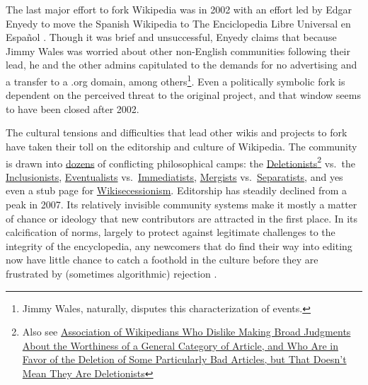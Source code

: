 \documentclass[notoc]{tufte-book}
\begin{document}
The last major effort to fork Wikipedia was in 2002 with an effort led
by Edgar Enyedy to move the Spanish Wikipedia to The Enciclopedia Libre
Universal en Español \citep{tkaczSpanishForkWikipedia2011, tkaczWikipediaPoliticsOpenness2014} . Though it was brief and
unsuccessful, Enyedy claims that because Jimmy Wales was worried about
other non-English communities following their lead, he and the other
admins capitulated to the demands for no advertising and a transfer to a
.org domain, among others\footnote{Jimmy Wales, naturally, disputes this
  characterization of events.}. Even a politically symbolic fork is
dependent on the perceived threat to the original project, and that
window seems to have been closed after 2002.

The cultural tensions and difficulties that lead other wikis and
projects to fork have taken their toll on the editorship and culture of
Wikipedia. The community is drawn into
\href{https://meta.wikimedia.org/wiki/Conflicting_Wikipedia_philosophies}{dozens}
of conflicting philosophical camps: the
\href{https://meta.wikimedia.org/wiki/Special:MyLanguage/Deletionism}{Deletionists}\footnote{Also
  see
  \href{https://meta.wikimedia.org/wiki/Association_of_Wikipedians_Who_Dislike_Making_Broad_Judgments_About_the_Worthiness_of_a_General_Category_of_Article,_and_Who_Are_in_Favor_of_the_Deletion_of_Some_Particularly_Bad_Articles,_but_That_Doesn\%27t_Mean_They_Are_Deletionists}{Association
  of Wikipedians Who Dislike Making Broad Judgments About the Worthiness
  of a General Category of Article, and Who Are in Favor of the Deletion
  of Some Particularly Bad Articles, but That Doesn't Mean They Are
  Deletionists}} vs.~the
\href{https://meta.wikimedia.org/wiki/Special:MyLanguage/Inclusionism}{Inclusionists},
\href{https://meta.wikimedia.org/wiki/Eventualism}{Eventualists}
vs.~\href{https://meta.wikimedia.org/wiki/Immediatism}{Immediatists},
\href{https://meta.wikimedia.org/wiki/Special:MyLanguage/Mergism}{Mergists}
vs.~\href{https://meta.wikimedia.org/wiki/Special:MyLanguage/Separatism}{Separatists},
and yes even a stub page for
\href{https://meta.wikimedia.org/wiki/Wikisecessionism}{Wikisecessionism}.
Editorship has steadily declined from a peak in 2007. Its relatively
invisible community systems make it mostly a matter of chance or
ideology that new contributors are attracted in the first place. In its
calcification of norms, largely to protect against legitimate challenges
to the integrity of the encyclopedia, any newcomers that do find their
way into editing now have little chance to catch a foothold in the
culture before they are frustrated by (sometimes algorithmic) rejection
\citep{hillWikipediaEndOpen2019, halfakerRiseDeclineOpen2013} .
\end{document}
